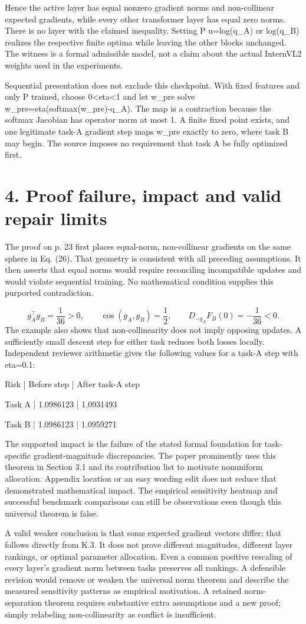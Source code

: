 \documentclass[10pt]{article}
\begin{document}
Hence the active layer has equal nonzero gradient norms and non-collinear expected gradients, while every other transformer layer has equal zero norms. There is no layer with the claimed inequality. Setting P u=log(q\_A) or log(q\_B) realizes the respective finite optima while leaving the other blocks unchanged. The witness is a formal admissible model, not a claim about the actual InternVL2 weights used in the experiments.\par
Sequential presentation does not exclude this checkpoint. With fixed features and only P trained, choose 0<eta<1 and let w\_pre solve w\_pre=eta(softmax(w\_pre)-q\_A). The map is a contraction because the softmax Jacobian has operator norm at most 1. A finite fixed point exists, and one legitimate task-A gradient step maps w\_pre exactly to zero, where task B may begin. The source imposes no requirement that task A be fully optimized first.\par
\section*{4. Proof failure, impact and valid repair limits}
The proof on p. 23 first places equal-norm, non-collinear gradients on the same sphere in Eq. (26). That geometry is consistent with all preceding assumptions. It then asserts that equal norms would require reconciling incompatible updates and would violate sequential training. No mathematical condition supplies this purported contradiction.\par
\[g_A^\top g_B=\frac1{36}>0,\qquad \cos(g_A,g_B)=\frac12,\qquad D_{-g_A}F_B(0)=-\frac1{36}<0.\] The example also shows that non-collinearity does not imply opposing updates. A sufficiently small descent step for either task reduces both losses locally. Independent reviewer arithmetic gives the following values for a task-A step with eta=0.1:\par
Risk | Before step | After task-A step\par
Task A | 1.0986123 | 1.0931493\par
Task B | 1.0986123 | 1.0959271\par
The supported impact is the failure of the stated formal foundation for task-specific gradient-magnitude discrepancies. The paper prominently uses this theorem in Section 3.1 and its contribution list to motivate nonuniform allocation. Appendix location or an easy wording edit does not reduce that demonstrated mathematical impact. The empirical sensitivity heatmap and successful benchmark comparisons can still be observations even though this universal theorem is false.\par
A valid weaker conclusion is that some expected gradient vectors differ; that follows directly from K.3. It does not prove different magnitudes, different layer rankings, or optimal parameter allocation. Even a common positive rescaling of every layer’s gradient norm between tasks preserves all rankings. A defensible revision would remove or weaken the universal norm theorem and describe the measured sensitivity patterns as empirical motivation. A retained norm-separation theorem requires substantive extra assumptions and a new proof; simply relabeling non-collinearity as conflict is insufficient.\par
\end{document}
